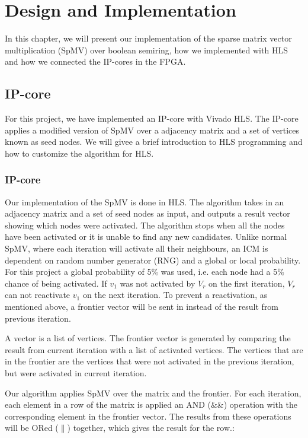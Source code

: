 \chapter{Design and Implementation} \label{methode}
In this chapter, we will present our implementation of the sparse matrix vector multiplication (SpMV) over boolean semiring, how we implemented with HLS and how we connected the IP-cores in the FPGA.

\section{IP-core}
For this project, we have implemented an IP-core with Vivado HLS. The IP-core applies a modified version of SpMV over a adjacency matrix and a set of vertices known as seed nodes. We will givee a brief introduction to HLS programming and how to customize the algorithm for HLS.

\subsection{IP-core}
Our implementation of the SpMV is done in HLS. The algorithm takes in an adjacency matrix and a set of seed nodes as input, and outputs a result vector showing which nodes were activated. The algorithm stops when all the nodes have been activated or it is unable to find any new candidates. Unlike normal SpMV, where each iteration will activate all their neighbours, an ICM is dependent on random number generator (RNG) and a global or local probability. For this project a global probability of 5\% was used, i.e. each node had a 5\% chance of being activated. If $v_1$ was not activated by $V_r$ on the first iteration, $V_r$ can not reactivate $v_1$ on the next iteration. To prevent a reactivation, as mentioned above, a frontier vector will be sent in instead of the result from previous iteration. 

A vector is a list of vertices. The frontier vector is generated by comparing the result from current iteration with a list of activated vertices. The vertices that are in the frontier are the vertices that were not activated in the previous iteration, but were activated in current iteration. 

Our algorithm applies SpMV over the matrix and the frontier. For each iteration, each element in a row of the matrix is applied an AND (\&\&) operation with the corresponding element in the frontier vector. The results from these operations will be ORed ($\|$) together, which gives the result for the row.:
\begin{algorithm}
\begin{algorithmic}[2]
\end{algorithmic}
\end{algorithm}



